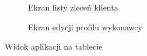 \begin{figure}[ht]
  \captionsetup[subfigure]{justification=centering}
  \centering
  \begin{subfigure}[t]{0.32\textwidth}
    \centering
    \caption{Ekran listy zleceń klienta}
  \end{subfigure}
  \begin{subfigure}[t]{0.50\textwidth}
    \centering
    \caption{Ekran edycji profilu wykonawcy}
  \end{subfigure}
  \caption{Widok aplikacji na tablecie}
  \label{fig:tablet}
\end{figure}

